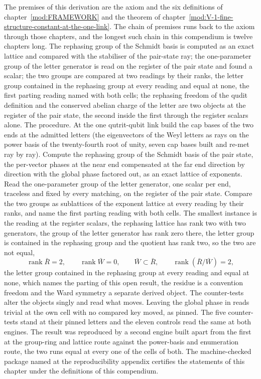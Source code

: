 \begin{chproof}
The premises of this derivation are the axiom and the six definitions of chapter~\ref{mod:FRAMEWORK} and the theorem of chapter~\ref{mod:V-1-fine-structure-constant-at-the-one-link}. The chain of premises runs back to the axiom through those chapters, and the longest such chain in this compendium is twelve chapters long.
The rephasing group of the Schmidt basis is computed as an exact lattice and compared with the stabiliser of the pair-state ray; the one-parameter group of the letter generator is read on the register of the pair state and found a scalar; the two groups are compared at two readings by their ranks, the letter group contained in the rephasing group at every reading and equal at none, the first parting reading named with both cells; the rephasing freedom of the qudit definition and the conserved abelian charge of the letter are two objects at the register of the pair state, the second inside the first through the register scalars alone.
The procedure. At the one qutrit-qubit link build the cap bases of the two ends at the admitted letters (the eigenvectors of the Weyl letters as rays on the power basis of the twenty-fourth root of unity, seven cap bases built and re-met ray by ray). Compute the rephasing group of the Schmidt basis of the pair state, the per-vector phases at the near end compensated at the far end direction by direction with the global phase factored out, as an exact lattice of exponents. Read the one-parameter group of the letter generator, one scalar per end, traceless and fixed by every matching, on the register of the pair state. Compare the two groups as sublattices of the exponent lattice at every reading by their ranks, and name the first parting reading with both cells. The smallest instance is the reading at the register scalars, the rephasing lattice has rank two with two generators, the group of the letter generator has rank zero there, the letter group is contained in the rephasing group and the quotient has rank two, so the two are not equal,
\begin{equation} \operatorname{rank} \bar{R} = 2, \qquad \operatorname{rank} \bar{W} = 0, \qquad \bar{W} \subset \bar{R}, \qquad \operatorname{rank}(\bar{R}/\bar{W}) = 2 , \end{equation} the letter group contained in the rephasing group at every reading and equal at none, which names the parting of this open result, the residue is a convention freedom and the Ward symmetry a separate derived object.
The counter-tests alter the objects singly and read what moves. Leaving the global phase in reads trivial at the own cell with no compared key moved, as pinned. The five counter-tests stand at their pinned letters and the eleven controls read the same at both engines. The result was reproduced by a second engine built apart from the first at the group-ring and lattice route against the power-basis and enumeration route, the two runs equal at every one of the cells of both.
The machine-checked package named at the reproducibility appendix certifies the statements of this chapter under the definitions of this compendium.
\end{chproof}
